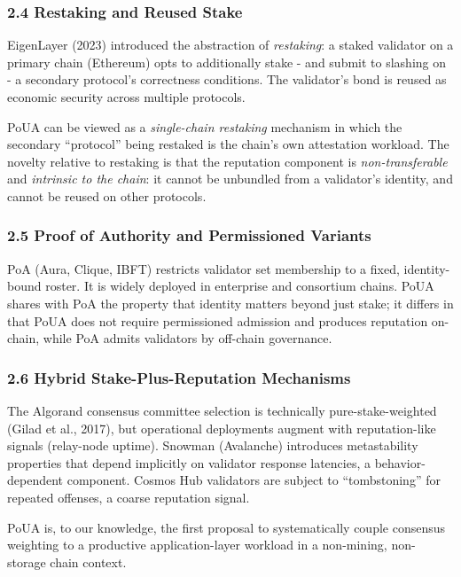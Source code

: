 \documentclass[
  11pt,
]{article}
\begin{document}
\subsubsection{2.4 Restaking and Reused
Stake}\label{restaking-and-reused-stake}

EigenLayer (2023) introduced the abstraction of \emph{restaking}: a
staked validator on a primary chain (Ethereum) opts to additionally
stake - and submit to slashing on - a secondary protocol's correctness
conditions. The validator's bond is reused as economic security across
multiple protocols.

PoUA can be viewed as a \emph{single-chain restaking} mechanism in which
the secondary ``protocol'' being restaked is the chain's own attestation
workload. The novelty relative to restaking is that the reputation
component is \emph{non-transferable} and \emph{intrinsic to the chain}:
it cannot be unbundled from a validator's identity, and cannot be reused
on other protocols.

\subsubsection{2.5 Proof of Authority and Permissioned
Variants}\label{proof-of-authority-and-permissioned-variants}

PoA (Aura, Clique, IBFT) restricts validator set membership to a fixed,
identity-bound roster. It is widely deployed in enterprise and
consortium chains. PoUA shares with PoA the property that identity
matters beyond just stake; it differs in that PoUA does not require
permissioned admission and produces reputation on-chain, while PoA
admits validators by off-chain governance.

\subsubsection{2.6 Hybrid Stake-Plus-Reputation
Mechanisms}\label{hybrid-stake-plus-reputation-mechanisms}

The Algorand consensus committee selection is technically
pure-stake-weighted (Gilad et al., 2017), but operational deployments
augment with reputation-like signals (relay-node uptime). Snowman
(Avalanche) introduces metastability properties that depend implicitly
on validator response latencies, a behavior-dependent component. Cosmos
Hub validators are subject to ``tombstoning'' for repeated offenses, a
coarse reputation signal.

PoUA is, to our knowledge, the first proposal to systematically couple
consensus weighting to a productive application-layer workload in a
non-mining, non-storage chain context.
\end{document}
